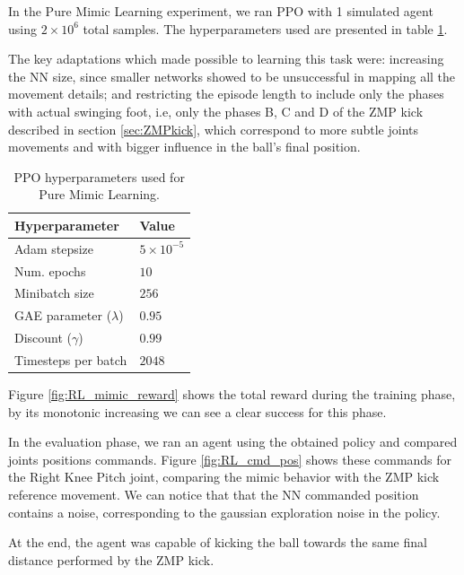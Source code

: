 In the Pure Mimic Learning experiment, we ran PPO with 1 simulated agent using  $2 \times 10^6$ total samples. The hyperparameters used are presented in table \ref{tab:ppo_pure_mimic}.

The key adaptations which made possible to learning this task were: increasing the NN size, since smaller networks showed to be unsuccessful in mapping all the movement details; and restricting the episode length to include only the phases with actual swinging foot, i.e, only the phases B, C and D of the ZMP kick described in section \ref{sec:ZMPkick}, which correspond to more subtle joints movements and with bigger influence in the ball's final position.

\begin{table}[ht]
    \begin{tabular}{|l|l|}
    \hline
    Hyperparameter            & Value    \\ \hline
    Adam stepsize             & $5 \times 10^{-5}$ \\
    Num. epochs               & $10$     \\
    Minibatch size            & $256$     \\
    GAE parameter ($\lambda$) & $0.95$   \\
    Discount ($\gamma$)		   & $0.99$	  \\
    Timesteps per batch       & $2048$   \\ \hline
    \end{tabular}
\centering
\caption{PPO hyperparameters used for Pure Mimic Learning.}
\label{tab:ppo_pure_mimic}
\end{table}

Figure \ref{fig:RL_mimic_reward} shows the total reward during the training phase, by its monotonic increasing we can see a clear success for this phase.

In the evaluation phase, we ran an agent using the obtained policy and compared joints positions commands. Figure \ref{fig:RL_cmd_pos} shows these commands for the Right Knee Pitch joint, comparing the mimic behavior with the ZMP kick reference movement. We can notice that that the NN commanded position contains a noise, corresponding to the gaussian exploration noise in the policy.

At the end, the agent was capable of kicking the ball towards the same final distance performed by the ZMP kick.


